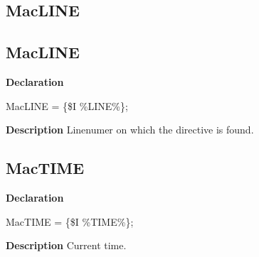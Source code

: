 \documentclass{report}
\newif\ifpdf
\begin{document}
\subsection*{\large{\textbf{MacLINE}}\normalsize\hspace{1ex}\hrulefill}
\else
\subsection*{MacLINE}
\fi
\label{ok_include_environment-MacLINE}
\begin{list}{}{
\setlength{\itemindent}{0cm}
\setlength{\listparindent}{0cm}
\setlength{\leftmargin}{\evensidemargin}
\addtolength{\leftmargin}{\tmplength}
\settowidth{\labelsep}{X}
\addtolength{\leftmargin}{\labelsep}
\setlength{\labelwidth}{\tmplength}
}
\item[\textbf{Declaration}\hfill]
\ifpdf
\begin{flushleft}
\fi
\begin{ttfamily}
MacLINE = {\{}{\$}I {\%}LINE{\%}{\}};\end{ttfamily}

\ifpdf
\end{flushleft}
\fi

\par
\item[\textbf{Description}]
Linenumer on which the directive is found.

\end{list}
\ifpdf
\subsection*{\large{\textbf{MacTIME}}\normalsize\hspace{1ex}\hrulefill}
\else
\subsection*{MacTIME}
\fi
\label{ok_include_environment-MacTIME}
\begin{list}{}{
\setlength{\itemindent}{0cm}
\setlength{\listparindent}{0cm}
\setlength{\leftmargin}{\evensidemargin}
\addtolength{\leftmargin}{\tmplength}
\settowidth{\labelsep}{X}
\addtolength{\leftmargin}{\labelsep}
\setlength{\labelwidth}{\tmplength}
}
\item[\textbf{Declaration}\hfill]
\ifpdf
\begin{flushleft}
\fi
\begin{ttfamily}
MacTIME = {\{}{\$}I {\%}TIME{\%}{\}};\end{ttfamily}

\ifpdf
\end{flushleft}
\fi

\par
\item[\textbf{Description}]
Current time.

\end{list}
\ifpdf
\end{document}
